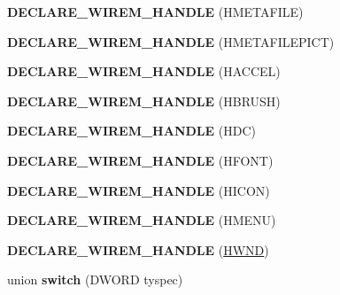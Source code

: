 \begin{DoxyCompactItemize}
{\bfseries D\+E\+C\+L\+A\+R\+E\+\_\+\+W\+I\+R\+E\+M\+\_\+\+H\+A\+N\+D\+LE} (H\+M\+E\+T\+A\+F\+I\+LE)
\item 
\mbox{\label{interface_i_win_types_a585e2a7731fd61436128f3402633ea84}} 
{\bfseries D\+E\+C\+L\+A\+R\+E\+\_\+\+W\+I\+R\+E\+M\+\_\+\+H\+A\+N\+D\+LE} (H\+M\+E\+T\+A\+F\+I\+L\+E\+P\+I\+CT)
\item 
\mbox{\label{interface_i_win_types_ac6d8e09aa0e116555df584e93fb6c729}} 
{\bfseries D\+E\+C\+L\+A\+R\+E\+\_\+\+W\+I\+R\+E\+M\+\_\+\+H\+A\+N\+D\+LE} (H\+A\+C\+C\+EL)
\item 
\mbox{\label{interface_i_win_types_a84a77e88c7ecce57d83943a9f0b9a1fc}} 
{\bfseries D\+E\+C\+L\+A\+R\+E\+\_\+\+W\+I\+R\+E\+M\+\_\+\+H\+A\+N\+D\+LE} (H\+B\+R\+U\+SH)
\item 
\mbox{\label{interface_i_win_types_aa7de36bc981db4ebcf0f3e4b5972e59a}} 
{\bfseries D\+E\+C\+L\+A\+R\+E\+\_\+\+W\+I\+R\+E\+M\+\_\+\+H\+A\+N\+D\+LE} (H\+DC)
\item 
\mbox{\label{interface_i_win_types_a96373c4f1b7e1e352e37e1c5691dc17f}} 
{\bfseries D\+E\+C\+L\+A\+R\+E\+\_\+\+W\+I\+R\+E\+M\+\_\+\+H\+A\+N\+D\+LE} (H\+F\+O\+NT)
\item 
\mbox{\label{interface_i_win_types_ab2500e51afcd62d6f84dc97470dd58ab}} 
{\bfseries D\+E\+C\+L\+A\+R\+E\+\_\+\+W\+I\+R\+E\+M\+\_\+\+H\+A\+N\+D\+LE} (H\+I\+C\+ON)
\item 
\mbox{\label{interface_i_win_types_a9f1165796626f27f1947876f687e2f30}} 
{\bfseries D\+E\+C\+L\+A\+R\+E\+\_\+\+W\+I\+R\+E\+M\+\_\+\+H\+A\+N\+D\+LE} (H\+M\+E\+NU)
\item 
\mbox{\label{interface_i_win_types_a1c223eea619c690d3ca207678802ef50}} 
{\bfseries D\+E\+C\+L\+A\+R\+E\+\_\+\+W\+I\+R\+E\+M\+\_\+\+H\+A\+N\+D\+LE} (\hyperlink{interfacevoid}{H\+W\+ND})
\item 
\mbox{\label{interface_i_win_types_abad6ec9c56acc9e2a11a3089b3ba65a0}} 
union {\bfseries switch} (D\+W\+O\+RD tyspec)
\end{DoxyCompactItemize}

